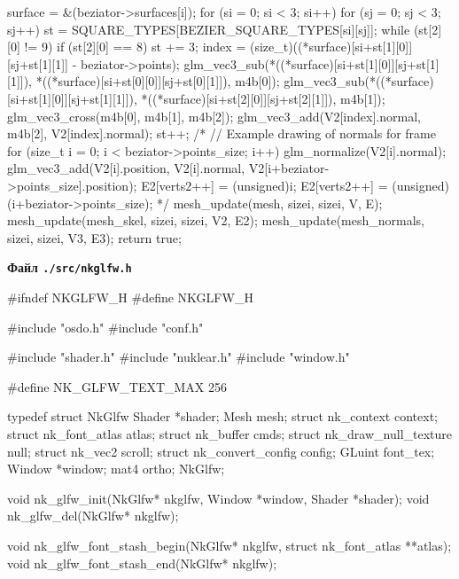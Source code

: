 \begin{multicols}{2}
\begin{ccode}
{{        surface = &(beziator->surfaces[i]);
        for (si = 0; si < 3; si++) {
            for (sj = 0; sj < 3; sj++) {
                st = SQUARE_TYPES[BEZIER_SQUARE_TYPES[si][sj]];
                while (st[2][0] != 9) {
                    if (st[2][0] == 8) {
                        st += 3;
                    }
                    index = (size_t)((*surface)[si+st[1][0]][sj+st[1][1]] - beziator->points);
                    glm_vec3_sub(*((*surface)[si+st[1][0]][sj+st[1][1]]),
                            *((*surface)[si+st[0][0]][sj+st[0][1]]), m4b[0]);
                    glm_vec3_sub(*((*surface)[si+st[1][0]][sj+st[1][1]]),
                            *((*surface)[si+st[2][0]][sj+st[2][1]]), m4b[1]);
                    glm_vec3_cross(m4b[0], m4b[1], m4b[2]);
                    glm_vec3_add(V2[index].normal, m4b[2], V2[index].normal);
                    st++;
                }
            }
        }
    }
    /*
    // Example drawing of normals for frame
    for (size_t i = 0; i < beziator->points_size; i++) {
        glm_normalize(V2[i].normal);
        glm_vec3_add(V2[i].position, V2[i].normal,
                     V2[i+beziator->points_size].position);
        E2[verts2++] = (unsigned)i;
        E2[verts2++] = (unsigned)(i+beziator->points_size);
    }*/
    mesh_update(mesh, sizei, sizei, V, E);
    mesh_update(mesh_skel, sizei, sizei, V2, E2);
    mesh_update(mesh_normals, sizei, sizei, V3, E3);
    return true;
}
\end{ccode}
\noindent\cprotect\textbf{Файл \verb+./src/nkglfw.h+}
\begin{ccode}
#ifndef NKGLFW_H
#define NKGLFW_H

#include "osdo.h"
#include "conf.h"

#include "shader.h"
#include "nuklear.h"
#include "window.h"

#define NK_GLFW_TEXT_MAX 256

typedef struct NkGlfw {
    Shader *shader;
    Mesh mesh;
    struct nk_context context;
    struct nk_font_atlas atlas;
    struct nk_buffer cmds;
    struct nk_draw_null_texture null;
    struct nk_vec2 scroll;
    struct nk_convert_config config;
    GLuint font_tex;
    Window *window;
    mat4 ortho;
} NkGlfw;

void nk_glfw_init(NkGlfw* nkglfw, Window *window, Shader *shader);
void nk_glfw_del(NkGlfw* nkglfw);

void nk_glfw_font_stash_begin(NkGlfw* nkglfw,
                              struct nk_font_atlas **atlas);
void nk_glfw_font_stash_end(NkGlfw* nkglfw);


\end{ccode}
\end{multicols}
